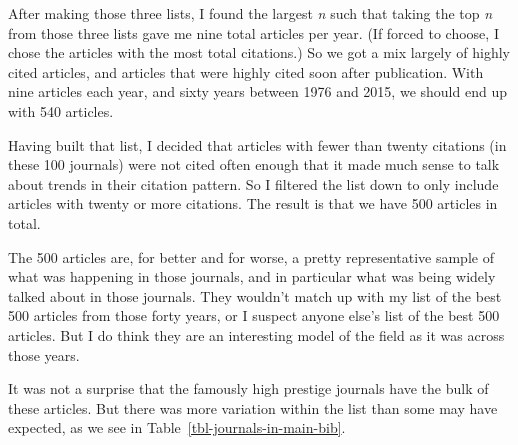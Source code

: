 \documentclass[
  10pt,
  letterpaper,
  DIV=11,
  numbers=noendperiod,
  twoside]{scrartcl}
\begin{document}
After making those three lists, I found the largest \emph{n} such that
taking the top \emph{n} from those three lists gave me nine total
articles per year. (If forced to choose, I chose the articles with the
most total citations.) So we got a mix largely of highly cited articles,
and articles that were highly cited soon after publication. With nine
articles each year, and sixty years between 1976 and 2015, we should end
up with 540 articles.

Having built that list, I decided that articles with fewer than twenty
citations (in these 100 journals) were not cited often enough that it
made much sense to talk about trends in their citation pattern. So I
filtered the list down to only include articles with twenty or more
citations. The result is that we have 500 articles in total.

The 500 articles are, for better and for worse, a pretty representative
sample of what was happening in those journals, and in particular what
was being widely talked about in those journals. They wouldn't match up
with my list of the best 500 articles from those forty years, or I
suspect anyone else's list of the best 500 articles. But I do think they
are an interesting model of the field as it was across those years.

It was not a surprise that the famously high prestige journals have the
bulk of these articles. But there was more variation within the list
than some may have expected, as we see in
Table~\ref{tbl-journals-in-main-bib}.
\end{document}
